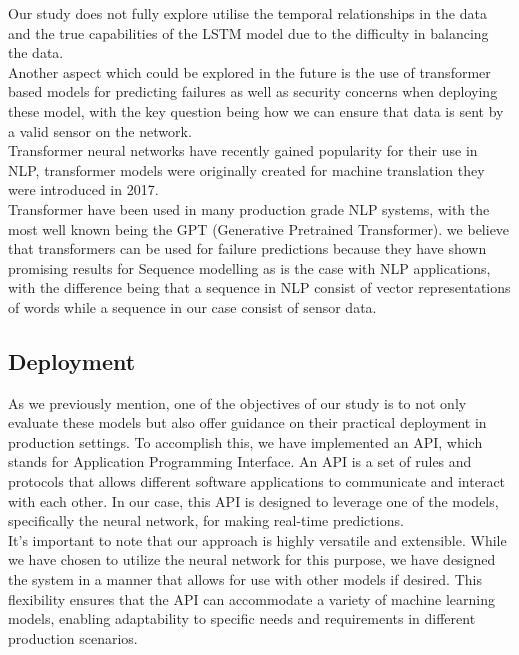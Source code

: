 \documentclass{article}
\begin{document}
Our study does not fully explore utilise the temporal relationships in the data and the true capabilities of the LSTM model due to the difficulty in balancing the data. \\

Another aspect which could be explored in the future is the use of transformer based models for predicting failures as well as security concerns when deploying these model, with the key question being how we can ensure that data is sent by a valid sensor on the network.\\

Transformer neural networks have recently gained popularity for their use in NLP, transformer models were originally created for machine translation they were introduced in 2017. \cite{Vaswani2017} \\

Transformer have been used in many production grade NLP systems, with the most well known being the GPT (Generative Pretrained Transformer). we believe that transformers can be used for failure predictions because they have shown promising results for Sequence modelling as is the case with NLP applications, with the difference being that a sequence in NLP consist of vector representations of words while a sequence in our case consist of sensor data.


\subsection{Deployment}
As we previously mention, one of the objectives of our study is to not only evaluate these models but also offer guidance on their practical deployment in production settings. To accomplish this, we have implemented an API, which stands for Application Programming Interface. An API is a set of rules and protocols that allows different software applications to communicate and interact with each other. In our case, this API is designed to leverage one of the models, specifically the neural network, for making real-time predictions.\\

It's important to note that our approach is highly versatile and extensible. While we have chosen to utilize the neural network for this purpose, we have designed the system in a manner that allows for use with other models if desired. This flexibility ensures that the API can accommodate a variety of machine learning models, enabling adaptability to specific needs and requirements in different production scenarios.\\
\end{document}
